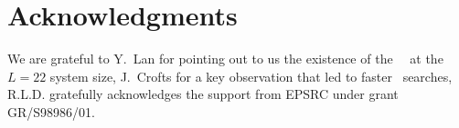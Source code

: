 
\section*{Acknowledgments}

We are grateful to Y.~Lan for pointing out to us the existence of
the  ~\eqv\ at the $L=22$ system size, J.~Crofts for a key
observation  that led to faster \rpo\ searches,
R.L.D. gratefully acknowledges the support from EPSRC under grant GR/S98986/01.

